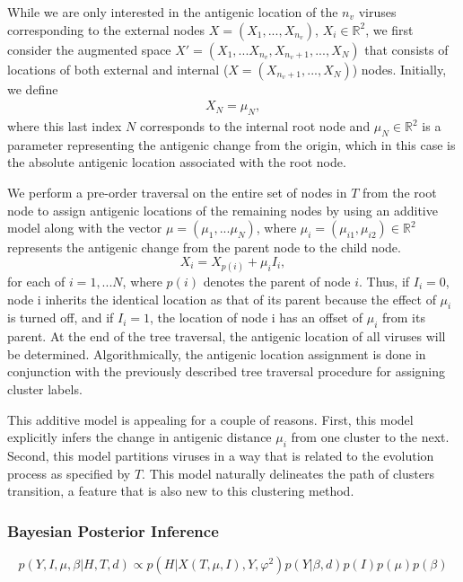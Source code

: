 \documentclass[11pt,oneside,letterpaper]{article}
\newcommand{\mdssd}{\varphi}						%
\begin{document}
While we are only interested in the antigenic location of the $n_v$ viruses corresponding to the external nodes $X=(X_1,..., X_{n_{v}})$, $X_i \in \mathbb{R}^{2}$, we first consider the augmented space $X' = (X_1, ...X_{n_v}, X_{ n_v +1},..., X_N)$ that consists of locations of both  external and internal ($X=(X_{n_v + 1},..., X_N)$) nodes.
Initially, we define
\begin{eqnarray}
 	X_{N} = \mu_N     ,
\end{eqnarray}
 where this last index $N$ corresponds to the internal root node and $\mu_N \in \mathbb{R}^{2}$ is a parameter representing the antigenic change from the origin, which in this case is the absolute antigenic location associated with the root node. 

We perform a pre-order traversal on the entire set of nodes in $T$  from the root node to assign antigenic locations of the remaining nodes by using an additive model along with the vector $\mu = (\mu_1,...\mu_N)$, where $\mu_i = (\mu_{i1},  \mu_{i2}) \in \mathbb{R}^{2}$ represents the antigenic change from the parent node to the child node.
\begin{equation}
	X_i=  X_{p(i)} + \mu_i    I_i   		,
\end{equation}
for each of $i=1,... N$, where $p(i)$ denotes the parent of node $i$.
Thus, if $I_i=0$, node i inherits the identical location as that of its parent because the effect of $\mu_i$ is turned off, and if $I_i=1$, the location of node i has an offset of $\mu_i$ from its parent.
At the end of the tree traversal, the antigenic location of all viruses will be determined.
Algorithmically, the antigenic location assignment is done in conjunction with the previously described tree traversal procedure for assigning cluster labels.


This additive model is appealing for a couple of reasons.
First, this model explicitly infers the change in antigenic distance $\mu_i$ from one cluster to the next.
Second, this model partitions viruses in a way that is related to the evolution process as specified by $T$.
This model naturally delineates the path of clusters transition, a feature that is also new to this clustering method.


\subsubsection*{Bayesian Posterior Inference}

\begin{equation}
  p(Y, I, \mu ,  \beta | H, T, d) \propto  p(H| X(T, \mu, I), Y , \mdssd^2) p(Y|  \beta, d) p(I) p(\mu) p(\beta)
\end{equation}
\end{document}
